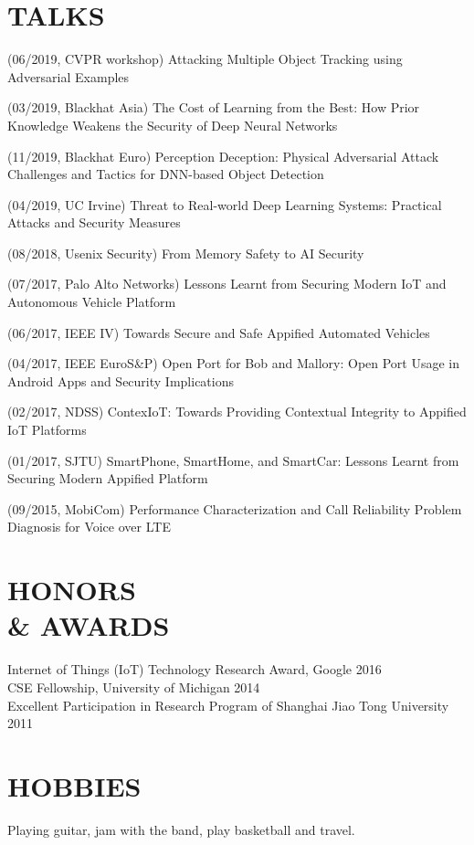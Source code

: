 \documentclass[margin]{res}
\begin{document}
\begin{resume}
\section{TALKS}

(06/2019, CVPR workshop) Attacking Multiple Object Tracking using Adversarial Examples

(03/2019, Blackhat Asia) The Cost of Learning from the Best: How Prior Knowledge Weakens the Security of Deep Neural Networks

(11/2019, Blackhat Euro) Perception Deception: Physical Adversarial Attack Challenges and Tactics for DNN-based Object Detection

(04/2019, UC Irvine) Threat to Real-world Deep Learning Systems: Practical Attacks and Security Measures

(08/2018, Usenix Security) From Memory Safety to AI Security

(07/2017, Palo Alto Networks) Lessons Learnt from Securing Modern IoT and Autonomous Vehicle Platform

(06/2017, IEEE IV) Towards Secure and Safe Appified Automated Vehicles

(04/2017, IEEE EuroS\&P) Open Port for Bob and Mallory: Open Port Usage in Android Apps and Security Implications

(02/2017, NDSS) ContexIoT: Towards Providing Contextual Integrity to Appified IoT Platforms

(01/2017, SJTU) SmartPhone, SmartHome, and SmartCar: Lessons Learnt from Securing Modern Appified Platform

(09/2015, MobiCom) Performance Characterization and Call Reliability Problem Diagnosis for Voice over LTE

\section{HONORS\\ \& AWARDS}
Internet of Things (IoT) Technology Research Award, Google \hfill 2016\\
CSE Fellowship, University of Michigan \hfill 2014 \\
Excellent Participation in Research Program of Shanghai Jiao Tong University \hfill 2011 \\

\section{HOBBIES}
Playing guitar, jam with the band, play basketball and travel. 
\end{resume}
\end{document}

